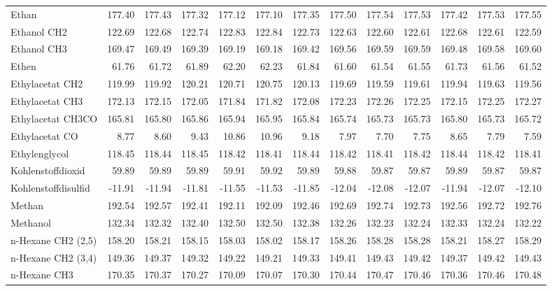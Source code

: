 \begin{table}[ht!]
{\begin{tabular}{lrrrrrrrrrrrr}
    Ethan & 177.40 & 177.43 & 177.32 & 177.12 & 177.10 & 177.35 & 177.50 & 177.54 & 177.53 & 177.42 & 177.53 & 177.55 \\
    Ethanol CH2 & 122.69 & 122.68 & 122.74 & 122.83 & 122.84 & 122.73 & 122.63 & 122.60 & 122.61 & 122.68 & 122.61 & 122.59 \\
    Ethanol CH3 & 169.47 & 169.49 & 169.39 & 169.19 & 169.18 & 169.42 & 169.56 & 169.59 & 169.59 & 169.48 & 169.58 & 169.60 \\
    Ethen & 61.76 & 61.72 & 61.89 & 62.20 & 62.23 & 61.84 & 61.60 & 61.54 & 61.55 & 61.73 & 61.56 & 61.52 \\
    Ethylacetat CH2 & 119.99 & 119.92 & 120.21 & 120.71 & 120.75 & 120.13 & 119.69 & 119.59 & 119.61 & 119.94 & 119.63 & 119.56 \\
    Ethylacetat CH3 & 172.13 & 172.15 & 172.05 & 171.84 & 171.82 & 172.08 & 172.23 & 172.26 & 172.25 & 172.15 & 172.25 & 172.27 \\
    Ethylacetat CH3CO & 165.81 & 165.80 & 165.86 & 165.94 & 165.95 & 165.84 & 165.74 & 165.73 & 165.73 & 165.80 & 165.73 & 165.72 \\
    Ethylacetat CO & 8.77  & 8.60  & 9.43  & 10.86 & 10.96 & 9.18  & 7.97  & 7.70  & 7.75  & 8.65  & 7.79  & 7.59 \\
    Ethylenglycol & 118.45 & 118.44 & 118.45 & 118.42 & 118.41 & 118.44 & 118.42 & 118.41 & 118.42 & 118.44 & 118.42 & 118.41 \\
    Kohlenstoffdioxid & 59.89 & 59.89 & 59.89 & 59.91 & 59.92 & 59.89 & 59.88 & 59.87 & 59.87 & 59.89 & 59.87 & 59.87 \\
    Kohlenstoffdisulfid & -11.91 & -11.94 & -11.81 & -11.55 & -11.53 & -11.85 & -12.04 & -12.08 & -12.07 & -11.94 & -12.07 & -12.10 \\
    Methan & 192.54 & 192.57 & 192.41 & 192.11 & 192.09 & 192.46 & 192.69 & 192.74 & 192.73 & 192.56 & 192.72 & 192.76 \\
    Methanol & 132.34 & 132.32 & 132.40 & 132.50 & 132.50 & 132.38 & 132.26 & 132.23 & 132.24 & 132.33 & 132.24 & 132.22 \\
    n-Hexane CH2 (2,5) & 158.20 & 158.21 & 158.15 & 158.03 & 158.02 & 158.17 & 158.26 & 158.28 & 158.28 & 158.21 & 158.27 & 158.29 \\
    n-Hexane CH2 (3,4) & 149.36 & 149.37 & 149.32 & 149.22 & 149.21 & 149.33 & 149.41 & 149.43 & 149.42 & 149.37 & 149.42 & 149.43 \\
    n-Hexane CH3 & 170.35 & 170.37 & 170.27 & 170.09 & 170.07 & 170.30 & 170.44 & 170.47 & 170.46 & 170.36 & 170.46 & 170.48 \\

\end{tabular}}
\end{table}
